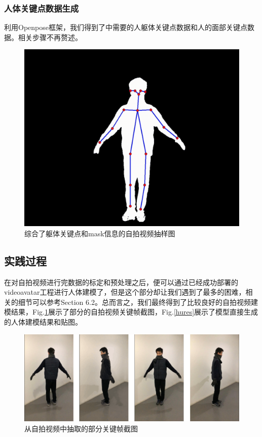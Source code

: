 \documentclass{article}
\begin{document}
\subsubsection{人体关键点数据生成}
利用Openpose\cite{openpose}框架，我们得到了\cite{paper1,paper2}中需要的人躯体关键点数据和人的面部关键点数据。相关步骤不再赘述。

\begin{figure}
	\centering
	\includegraphics[width=12cm]{figure/kp_mask}
	\caption{综合了躯体关键点和mask信息的自拍视频抽样图}
\end{figure}

\subsection{实践过程}
在对自拍视频进行完数据的标定和预处理之后，便可以通过已经成功部署的videoavatar工程进行人体建模了，但是这个部分却让我们遇到了最多的困难，相关的细节可以参考Section 6.2。总而言之，我们最终得到了比较良好的自拍视频建模结果，Fig.\ref{huvideo}展示了部分的自拍视频关键帧截图，Fig.\ref{hures}展示了模型直接生成的人体建模结果和贴图。

\begin{figure}[H]
	\centering
	\includegraphics[width=14cm]{figure/huhuhu}
	\caption{从自拍视频中抽取的部分关键帧截图}
	\label{huvideo}
\end{figure}
\end{document}
